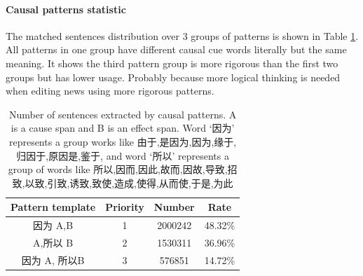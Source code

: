 \paragraph{Causal patterns statistic} The matched sentences distribution over 3 groups of patterns is shown in Table \ref{tab:pattern_statistics}. All patterns in one group have different causal cue words literally but the same meaning. It shows the third pattern group is more rigorous than the first two groups but has lower usage. Probably because more logical thinking is needed when editing news using more rigorous patterns.

	
\begin{table}[htbp]
	\centering
	\begin{tabular}{|c|c|c|c|} \hline
		\textbf{Pattern template}& \textbf{Priority}&\textbf{Number}& \textbf{Rate}\\	\hline 
		因为 A,B&1&2000242&48.32\% \\ \hline 
		A,所以 B&2&1530311&36.96\% \\ \hline 
		因为 A, 所以B&3&576851&14.72\% \\	\hline
	\end{tabular}
	\caption{Number of sentences extracted by causal patterns. A is a cause span and B is an effect span. Word `因为' represents a group works like 由于,是因为,因为,缘于,归因于,原因是,鉴于, and word `所以' represents a group of words like 所以,因而,因此,故而,因故,导致,招致,以致,引致,诱致,致使,造成,使得,从而使,于是,为此}
	\label{tab:pattern_statistics}
\end{table}	
